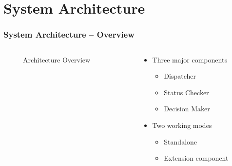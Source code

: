 \section{System Architecture}

\begin{frame}
  \frametitle{System Architecture -- Overview}
  \begin{columns}

    \begin{column}{.5\textwidth}
      \begin{figure}
        \resizebox{\linewidth}{!}{
          
        }
        \caption{Architecture Overview}
        \label{fig:archi-overview}
      \end{figure}
    \end{column}
    \begin{column}{.5\textwidth}
      \begin{itemize}
        \item Three major components
          \begin{itemize}
            \item Dispatcher
            \item Status Checker
            \item Decision Maker
          \end{itemize}
        \item Two working modes
          \begin{itemize}
            \item Standalone
            \item Extension component
          \end{itemize}
      \end{itemize}
    \end{column}

  \end{columns}
\end{frame}
